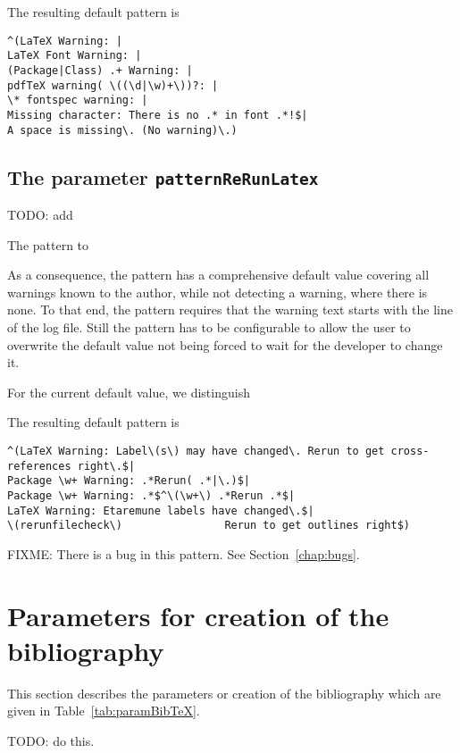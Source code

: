 The resulting default pattern is 
%
\begin{Verbatim}
^(LaTeX Warning: |
LaTeX Font Warning: |
(Package|Class) .+ Warning: |
pdfTeX warning( \((\d|\w)+\))?: |
\* fontspec warning: |
Missing character: There is no .* in font .*!$|
A space is missing\. (No warning)\.)
\end{Verbatim}


\subsection{The parameter \texttt{patternReRunLatex}}%
\label{subsec:patternReRunLatex}
TODO\@: add 

The pattern to 

As a consequence, the pattern has a comprehensive default value 
covering all warnings known to the author, 
while not detecting a warning, where there is none. 
To that end, the pattern requires 
that the warning text starts with the line of the log file. 
Still the pattern has to be configurable 
to allow the user to overwrite the default value 
not being forced to wait for the developer to change it. 

For the current default value, we distinguish 

The resulting default pattern is 
%
\begin{Verbatim}[fontsize=\scriptsize]
^(LaTeX Warning: Label\(s\) may have changed\. Rerun to get cross-references right\.$|
Package \w+ Warning: .*Rerun( .*|\.)$|
Package \w+ Warning: .*$^\(\w+\) .*Rerun .*$|
LaTeX Warning: Etaremune labels have changed\.$|
\(rerunfilecheck\)                Rerun to get outlines right$)
\end{Verbatim}

FIXME\@: There is a bug in this pattern. See Section~\ref{chap:bugs}. 


\section{Parameters for creation of the bibliography}\label{sec:settingsBibTeX}

This section describes the parameters 
or creation of the bibliography
which are given in Table~\ref{tab:paramBibTeX}. 

TODO\@: do this. 

